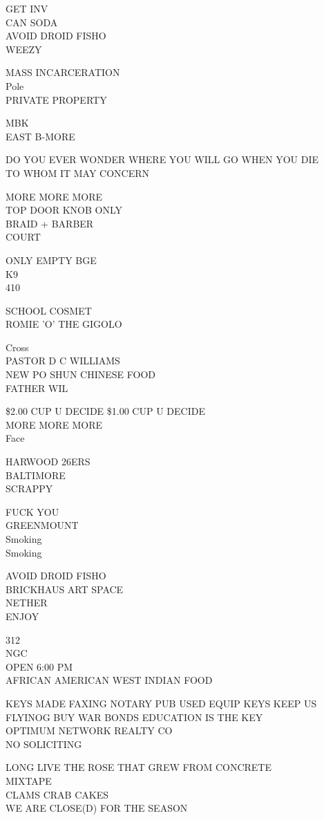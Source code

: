 \documentclass[10pt,letterpaper]{article}
\begin{document}
GET INV\\
CAN SODA\\
AVOID DROID FISHO\\
WEEZY

MASS INCARCERATION\\
Pole\\
PRIVATE PROPERTY

MBK\\
EAST B{-}MORE

DO YOU EVER WONDER WHERE YOU WILL GO WHEN YOU DIE\\
TO WHOM IT MAY CONCERN

MORE MORE MORE\\
TOP DOOR KNOB ONLY\\
BRAID + BARBER\\
COURT

ONLY EMPTY BGE\\
K9\\
410

SCHOOL COSMET\\
ROMIE 'O' THE GIGOLO

Cross\\
PASTOR D C WILLIAMS\\
NEW PO SHUN CHINESE FOOD\\
FATHER WIL

\$2.00 CUP U DECIDE \$1.00 CUP U DECIDE\\
MORE MORE MORE\\
Face

HARWOOD 26ERS\\
BALTIMORE\\
SCRAPPY

FUCK YOU\\
GREENMOUNT\\
Smoking\\
Smoking

AVOID DROID FISHO\\
BRICKHAUS ART SPACE\\
NETHER\\
ENJOY

312\\
NGC\\
OPEN 6:00 PM\\
AFRICAN AMERICAN WEST INDIAN FOOD

KEYS MADE FAXING NOTARY PUB USED EQUIP KEYS KEEP US FLYINOG BUY WAR BONDS EDUCATION IS THE KEY\\
OPTIMUM NETWORK REALTY CO\\
NO SOLICITING

LONG LIVE THE ROSE THAT GREW FROM CONCRETE\\
MIXTAPE\\
CLAMS CRAB CAKES\\
WE ARE CLOSE(D) FOR THE SEASON
\end{document}
